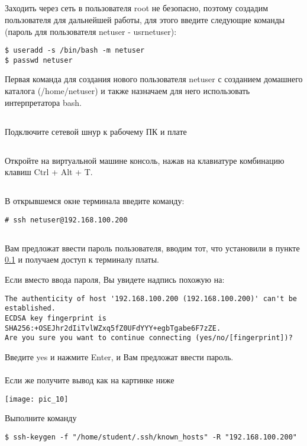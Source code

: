 \subsection{}\label{lab2:ref1}Заходить через сеть в пользователя root не безопасно, поэтому создадим пользователя для дальнейшей работы, для этого введите следующие команды (пароль для пользователя netuser - usrnetuser):
\begin{lstlisting}[style=bash]
$ useradd -s /bin/bash -m netuser
$ passwd netuser
\end{lstlisting}

Первая команда для создания нового пользователя netuser с созданием домашнего каталога (/home/netuser) и также назначаем для него использовать интерпретатора bash. 

\subsection{}Подключите сетевой шнур к рабочему ПК и плате

\subsection{}Откройте на виртуальной машине консоль, нажав на клавиатуре комбинацию клавиш Ctrl + Alt + T. 

\subsection{}\label{lab2:ref2}В открывшемся окне терминала введите команду: 
\begin{lstlisting}[style=bash]
# ssh netuser@192.168.100.200
\end{lstlisting}

\subsection{}Вам предложат ввести пароль пользователя, вводим тот, что установили в пункте \ref{lab2:ref1} и получаем доступ к терминалу платы.

Если вместо ввода пароля, Вы увидете надпись похожую на:
\begin{lstlisting}[style=stdout]
The authenticity of host '192.168.100.200 (192.168.100.200)' can't be established.
ECDSA key fingerprint is SHA256:+OSEJhr2dIiTvlWZxq5fZ0UFdYYY+egbTgabe6F7zZE.
Are you sure you want to continue connecting (yes/no/[fingerprint])?
\end{lstlisting}
Введите yes и нажмите Enter, и Вам предложат ввести пароль.
\\\\
Если же получите вывод как на картинке ниже
\begin{center}
	\texttt{[image: pic\_10]}
\end{center}
Выполните команду 
\begin{lstlisting}[style=bash]
$ ssh-keygen -f "/home/student/.ssh/known_hosts" -R "192.168.100.200"
\end{lstlisting}

